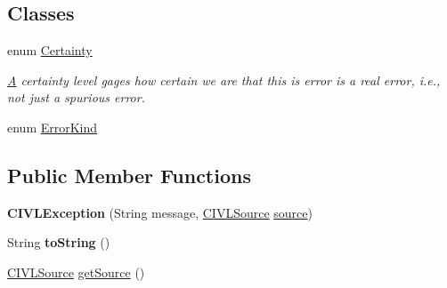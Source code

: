 \subsection*{Classes}
\begin{DoxyCompactItemize}
\item 
enum \hyperlink{enumedu_1_1udel_1_1cis_1_1vsl_1_1civl_1_1model_1_1IF_1_1CIVLException_1_1Certainty}{Certainty}
\begin{DoxyCompactList}\small\item\em \hyperlink{structA}{A} certainty level gages how certain we are that this is error is a real error, i.\+e., not just a spurious error. \end{DoxyCompactList}\item 
enum \hyperlink{enumedu_1_1udel_1_1cis_1_1vsl_1_1civl_1_1model_1_1IF_1_1CIVLException_1_1ErrorKind}{Error\+Kind}
\end{DoxyCompactItemize}
\subsection*{Public Member Functions}
\begin{DoxyCompactItemize}
\item 
\hypertarget{classedu_1_1udel_1_1cis_1_1vsl_1_1civl_1_1model_1_1IF_1_1CIVLException_a461db53f1043d79d39a0aa1599864dd9}{}{\bfseries C\+I\+V\+L\+Exception} (String message, \hyperlink{interfaceedu_1_1udel_1_1cis_1_1vsl_1_1civl_1_1model_1_1IF_1_1CIVLSource}{C\+I\+V\+L\+Source} \hyperlink{classedu_1_1udel_1_1cis_1_1vsl_1_1civl_1_1model_1_1IF_1_1CIVLException_a29eba9d3541bcd7e2306404c6ece4d98}{source})\label{classedu_1_1udel_1_1cis_1_1vsl_1_1civl_1_1model_1_1IF_1_1CIVLException_a461db53f1043d79d39a0aa1599864dd9}

\item 
\hypertarget{classedu_1_1udel_1_1cis_1_1vsl_1_1civl_1_1model_1_1IF_1_1CIVLException_a86339269ef89727441cfd1372af5ff31}{}String {\bfseries to\+String} ()\label{classedu_1_1udel_1_1cis_1_1vsl_1_1civl_1_1model_1_1IF_1_1CIVLException_a86339269ef89727441cfd1372af5ff31}

\item 
\hyperlink{interfaceedu_1_1udel_1_1cis_1_1vsl_1_1civl_1_1model_1_1IF_1_1CIVLSource}{C\+I\+V\+L\+Source} \hyperlink{classedu_1_1udel_1_1cis_1_1vsl_1_1civl_1_1model_1_1IF_1_1CIVLException_a43e7be93435582acfdb6c006756ec768}{get\+Source} ()
\end{DoxyCompactItemize}
